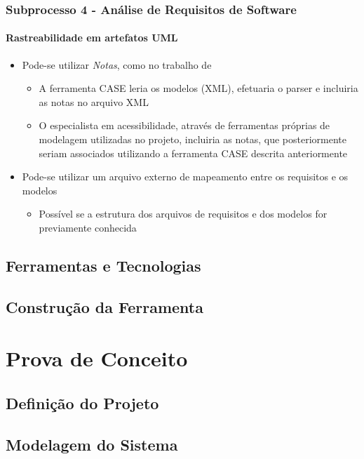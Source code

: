 \documentclass{beamer}
\begin{document}
\begin{frame}
\frametitle{Subprocesso 4 - Análise de Requisitos de Software}
\framesubtitle{Rastreabilidade em artefatos UML}

\begin{itemize}
  \item Pode-se utilizar \textit{Notas}, como no trabalho de \citet{Joonhoon:09}
  \begin{itemize}
    \item A ferramenta CASE leria os modelos (XML), efetuaria o parser e incluiria as notas no arquivo XML
    \item O especialista em acessibilidade, através de ferramentas próprias de modelagem utilizadas no projeto, incluiria as notas, que posteriormente seriam associados utilizando a ferramenta CASE descrita anteriormente
   \end{itemize}
  \item Pode-se utilizar um arquivo externo de mapeamento entre os requisitos e os modelos
  \begin{itemize}
    \item Possível se a estrutura dos arquivos de requisitos e dos modelos for previamente conhecida
  \end{itemize}
\end{itemize}

\end{frame}

\subsection[Ferramentas e Tecnologias]{Ferramentas e Tecnologias}

\subsection[Construção da Ferramenta]{Construção da Ferramenta}

\section{Prova de Conceito}

\subsection[Definição do Projeto]{Definição do Projeto}

\subsection[Modelagem do Sistema]{Modelagem do Sistema}
\end{document}
